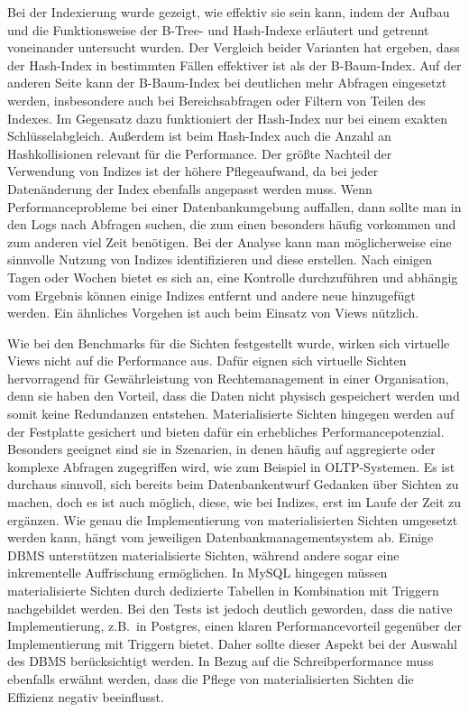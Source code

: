 Bei der Indexierung wurde gezeigt, wie effektiv sie sein kann, indem der Aufbau und die Funktionsweise der B-Tree- und Hash-Indexe erläutert und getrennt voneinander untersucht wurden.
Der Vergleich beider Varianten hat ergeben, dass der Hash-Index in bestimmten Fällen effektiver ist als der B-Baum-Index.
Auf der anderen Seite kann der B-Baum-Index bei deutlichen mehr Abfragen eingesetzt werden, insbesondere auch bei Bereichsabfragen oder Filtern von Teilen des Indexes.
Im Gegensatz dazu funktioniert der Hash-Index nur bei einem exakten Schlüsselabgleich.
Außerdem ist beim Hash-Index auch die Anzahl an Hashkollisionen relevant für die Performance.
Der größte Nachteil der Verwendung von Indizes ist der höhere Pflegeaufwand, da bei jeder Datenänderung der Index ebenfalls angepasst werden muss.
Wenn Performanceprobleme bei einer Datenbankumgebung auffallen, dann sollte man in den Logs nach Abfragen suchen, die zum einen besonders häufig vorkommen und zum anderen viel Zeit benötigen.
Bei der Analyse kann man möglicherweise eine sinnvolle Nutzung von Indizes identifizieren und diese erstellen.
Nach einigen Tagen oder Wochen bietet es sich an, eine Kontrolle durchzuführen und abhängig vom Ergebnis können einige Indizes entfernt und andere neue hinzugefügt werden.
Ein ähnliches Vorgehen ist auch beim Einsatz von Views nützlich.

Wie bei den Benchmarks für die Sichten festgestellt wurde, wirken sich virtuelle Views nicht auf die Performance aus.
Dafür eignen sich virtuelle Sichten hervorragend für Gewährleistung von Rechtemanagement in einer Organisation, denn sie haben den Vorteil, dass die Daten nicht physisch gespeichert werden und somit keine Redundanzen entstehen.
Materialisierte Sichten hingegen werden auf der Festplatte gesichert und bieten dafür ein erhebliches Performancepotenzial.
Besonders geeignet sind sie in Szenarien, in denen häufig auf aggregierte oder komplexe Abfragen zugegriffen wird, wie zum Beispiel in OLTP-Systemen.
Es ist durchaus sinnvoll, sich bereits beim Datenbankentwurf Gedanken über Sichten zu machen, doch es ist auch möglich, diese, wie bei Indizes, erst im Laufe der Zeit zu ergänzen.
Wie genau die Implementierung von materialisierten Sichten umgesetzt werden kann, hängt vom jeweiligen Datenbankmanagementsystem ab.
Einige DBMS unterstützen materialisierte Sichten, während andere sogar eine inkrementelle Auffrischung ermöglichen.
In MySQL hingegen müssen materialisierte Sichten durch dedizierte Tabellen in Kombination mit Triggern nachgebildet werden.
Bei den Tests ist jedoch deutlich geworden, dass die native Implementierung, z.B.\ in Postgres, einen klaren Performancevorteil gegenüber der Implementierung mit Triggern bietet.
Daher sollte dieser Aspekt bei der Auswahl des DBMS berücksichtigt werden.
In Bezug auf die Schreibperformance muss ebenfalls erwähnt werden, dass die Pflege von materialisierten Sichten die Effizienz negativ beeinflusst.

